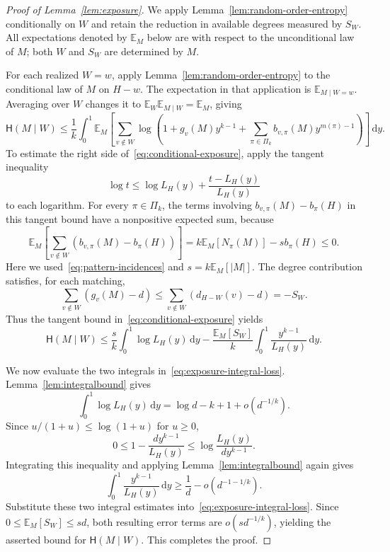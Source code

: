 \documentclass[11pt,reqno]{amsart}
\numberwithin{equation}{section}
\theoremstyle{plain}
\theoremstyle{definition}
\newcommand{\E}{\mathbb E}
\newcommand{\HH}{\mathsf H}
\newcommand{\dd}{\,\mathrm d}
\begin{document}
\begin{proof}[Proof of Lemma~\ref{lem:exposure}]
    We apply Lemma~\ref{lem:random-order-entropy} conditionally on $W$ and retain the reduction in available degrees measured by $S_W$.
    All expectations denoted by $\E_M$ below are with respect to the unconditional law of $M$; both $W$ and $S_W$ are determined by $M$.

    For each realized $W=w$, apply Lemma~\ref{lem:random-order-entropy} to the conditional law of $M$ on $H-w$.
    The expectation in that application is $\E_{M\mid W=w}$.
    Averaging over $W$ changes it to $\E_W\E_{M\mid W}=\E_M$, giving
    \begin{equation}\label{eq:conditional-exposure}
        \HH(M\mid W)\le\frac1k\int_0^1\E_M\left[\sum_{v\notin W}
        \log\left(1+g_v(M)y^{k-1}+\sum_{\pi\in\Pi_k}b_{v,\pi}(M)y^{m(\pi)-1}\right)\right]\dd y.
    \end{equation}
    To estimate the right side of~\eqref{eq:conditional-exposure}, apply the tangent inequality
    \[
        \log t\le\log L_H(y)+\frac{t-L_H(y)}{L_H(y)}
    \]
    to each logarithm.
    For every $\pi\in\Pi_k$, the terms involving $b_{v,\pi}(M)-b_\pi(H)$ in this tangent bound have a nonpositive expected sum, because
    \[
        \E_M\left[\sum_{v\notin W}(b_{v,\pi}(M)-b_\pi(H))\right]
        =k\E_M[N_\pi(M)]-s b_\pi(H)\le0.
    \]
    Here we used~\eqref{eq:pattern-incidences} and $s=k\E_M[|M|]$.
    The degree contribution satisfies, for each matching,
    \[
        \sum_{v\notin W}(g_v(M)-d)
        \le\sum_{v\notin W}(d_{H-W}(v)-d)=-S_W.
    \]
    Thus the tangent bound in~\eqref{eq:conditional-exposure} yields
    \begin{equation}\label{eq:exposure-integral-loss}
        \HH(M\mid W)\le\frac sk\int_0^1\log L_H(y)\dd y
        -\frac{\E_M[S_W]}k\int_0^1\frac{y^{k-1}}{L_H(y)}\dd y.
    \end{equation}

    We now evaluate the two integrals in~\eqref{eq:exposure-integral-loss}.
    Lemma~\ref{lem:integralbound} gives
    \[
        \int_0^1\log L_H(y)\dd y=\log d-k+1+o(d^{-1/k}).
    \]
    Since $u/(1+u)\le\log(1+u)$ for $u\ge0$,
    \[
        0\le1-\frac{dy^{k-1}}{L_H(y)}
        \le\log\frac{L_H(y)}{dy^{k-1}}.
    \]
    Integrating this inequality and applying Lemma~\ref{lem:integralbound} again gives
    \[
        \int_0^1\frac{y^{k-1}}{L_H(y)}\dd y\ge\frac1d-o(d^{-1-1/k}).
    \]
    Substitute these two integral estimates into~\eqref{eq:exposure-integral-loss}.
    Since $0\le\E_M[S_W]\le sd$, both resulting error terms are $o(sd^{-1/k})$, yielding the asserted bound for $\HH(M\mid W)$.
    This completes the proof.
\end{proof}
\end{document}
